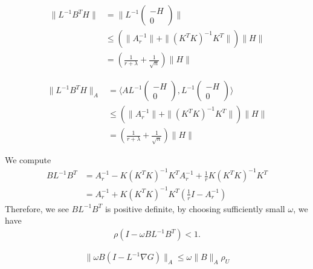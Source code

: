 \begin{itemize}
\begin{equation}
\begin{aligned}
   \| L^{-1} B^T H \| & = \| L^{-1}  \begin{pmatrix}
   -H \\
   0
   \end{pmatrix}\|  \\
   & \leq \left(\|A_r^{-1}\| +\| (K^T K)^{-1}K^T \|\right) \|H\| \\
   & = (\frac{1}{r + \lambda } + \frac{1}{\sqrt{n}} ) \|H\| 
\end{aligned}
\end{equation}


\begin{equation}
\begin{aligned}
   \| L^{-1} B^T H \|_A & = \langle A L^{-1}  \begin{pmatrix}
   -H \\
   0
   \end{pmatrix},  L^{-1}  \begin{pmatrix}
   -H \\
   0
   \end{pmatrix} \rangle  \\
   & \leq \left(\|A_r^{-1}\| +\| (K^T K)^{-1}K^T \|\right) \|H\| \\
   & = (\frac{1}{r + \lambda } + \frac{1}{\sqrt{n}} ) \|H\| 
\end{aligned}
\end{equation}


We compute 
\begin{equation}
\begin{aligned}
       BL^{-1}B^T & = A_r^{-1} - K (K^T K)^{-1} K^T A_r^{-1} + \frac{1}{r}K (K^T K)^{-1}K^T \\
       & = A_r^{-1} + K (K^T K)^{-1} K^T (\frac{1}{r} I - A_r^{-1})
\end{aligned}
\end{equation}
Therefore, we see $BL^{-1} B^T$ is positive definite, by choosing sufficiently small $\omega$, we have
\begin{equation}
\begin{aligned}
   \rho ( I - \omega B L^{-1} B^T ) < 1 .
\end{aligned}
\end{equation}

\begin{equation}
     \| \omega B (I - L^{-1} \nabla G) \|_A \leq \omega \|B \|_A \rho_U
\end{equation}



\end{itemize}
